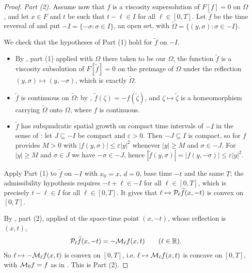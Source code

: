 \begin{proof}
\emph{Part (2).}
Assume now that $f$ is a viscosity supersolution of $F[f]=0$ on $\Omega$, and let
$x\in F$ and $t$ be such that $t-\ell\in I$ for all $\ell\in[0,T]$. Let
$\widetilde f$ be the time reversal of  and put
$-I=\{-\sigma:\sigma\in I\}$, an open set, with
$\widetilde\Omega=\{(y,\sigma):\sigma\in-I\}$.

We check that the hypotheses of Part (1) hold for $\widetilde f$ on $-I$.
\begin{itemize}
\item By , part (1) applied with $\Omega$ there taken to be
our $\Omega$, the function $\widetilde f$ is a viscosity subsolution of
$F[\widetilde f]=0$ on the preimage of $\Omega$ under the reflection
$(y,\sigma)\mapsto(y,-\sigma)$, which is exactly $\widetilde\Omega$.
\item $\widetilde f$ is continuous on $\widetilde\Omega$: by ,
$\widetilde f(\zeta)=-f(\widetilde\zeta)$, and $\zeta\mapsto\widetilde\zeta$ is a
homeomorphism carrying $\widetilde\Omega$ onto $\Omega$, where $f$ is
continuous.
\item $\widetilde f$ has subquadratic spatial growth on compact time intervals of
$-I$ in the sense of : let $J\subseteq-I$ be compact
and $\varepsilon>0$. Then $-J\subseteq I$ is compact, so
 for $f$ provides $M>0$ with
$|f(y,\sigma)|\le\varepsilon|y|^2$ whenever $|y|\ge M$ and $\sigma\in-J$. For
$|y|\ge M$ and $\sigma\in J$ we have $-\sigma\in-J$, hence
$|\widetilde f(y,\sigma)|=|f(y,-\sigma)|\le\varepsilon|y|^2$.
\end{itemize}

Apply Part (1) to $\widetilde f$ on $-I$ with $x_0=x$, $d=0$, base time $-t$ and
the same $T$; the admissibility hypothesis requires $-t+\ell\in-I$ for all
$\ell\in[0,T]$, which is precisely $t-\ell\in I$ for all $\ell\in[0,T]$. It
gives that $\ell\mapsto\mathcal{P}_\ell\widetilde f(x,-t)$ is convex on $[0,T]$.

By , part (2), applied at the space-time point
$(x,-t)$, whose reflection is $(x,t)$,
\[
  \mathcal{P}_\ell\widetilde f(x,-t)=-\mathcal{M}_\ell f(x,t)\qquad(\ell\in\mathbb{R}).
\]
So $\ell\mapsto-\mathcal{M}_\ell f(x,t)$ is convex on $[0,T]$, i.e.
$\ell\mapsto\mathcal{M}_\ell f(x,t)$ is concave on $[0,T]$, with
$\mathcal{M}_0f=f$ as in . This is Part (2).
\end{proof}
